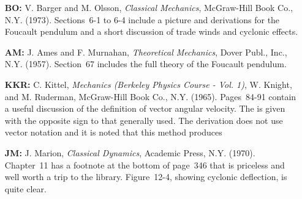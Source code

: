 {{\begin{itemize}
\begin{itemize}
\item [\bf BO:] V. Barger and M. Olsson, \textit{Classical Mechanics},
McGraw-Hill Book Co., N.Y. (1973).
Sections~6-1 to 6-4 include a picture and derivations for the Foucault
pendulum and a short discussion of trade winds and cyclonic effects.

\item [\bf AM:] J. Ames and F. Murnahan, \textit{Theoretical Mechanics}, Dover
Publ., Inc., N.Y. (1957).
Section~67 includes the full theory of the Foucault pendulum.

\item [\bf KKR:] C. Kittel, \textit{Mechanics (Berkeley Physics Course -
Vol. 1)}, W. Knight, and M. Ruderman, McGraw-Hill Book Co., N.Y. (1965).
Pages~84-91 contain a useful discussion of the definition of vector angular
velocity.
The  is given with the opposite sign to that
generally used.
The derivation does not use vector notation and it is noted that this
method produces 

\item [\bf JM:] J. Marion, \textit{Classical Dynamics}, Academic Press, N.Y.
(1970).
Chapter~11 has a footnote at the bottom of page~346 that is priceless and
well worth a trip to the library.
Figure~12-4, showing cyclonic deflection, is quite clear.
\end{itemize}
\end{itemize}
}%
%
}%